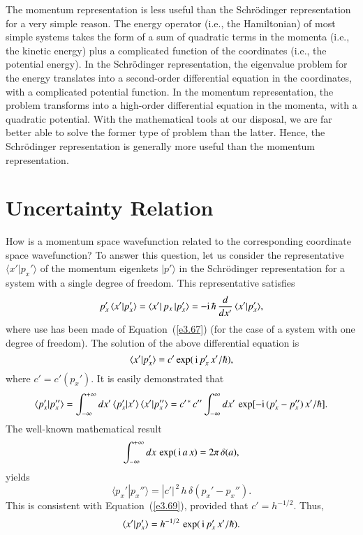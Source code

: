 The momentum representation is less useful than the Schr\"{o}dinger representation
for  a very simple reason. The energy operator ({\rm i.e.}, the Hamiltonian) of
most simple systems takes the form of a sum of quadratic terms in the momenta
({\rm i.e.}, the kinetic energy) plus a complicated function of the coordinates
({\rm i.e.}, the potential energy). In the Schr\"{o}dinger  representation,
the eigenvalue problem for the energy translates into a second-order differential
equation in the coordinates, with a complicated potential function. In the
momentum representation, the problem transforms into a high-order differential
equation in the momenta, with a quadratic potential. With the mathematical
tools at our disposal, we are far better able to solve the former type of problem
than the latter. Hence, the Schr\"{o}dinger  representation is
generally more useful than the momentum representation. 

\section{Uncertainty Relation}
How is a momentum space wavefunction related to the corresponding coordinate
space wavefunction? To answer this question, let us consider the
representative $\langle x'|p_x'\rangle$ of the
 momentum eigenkets $|p'\rangle$ in the Schr\"{o}dinger  representation
for a system with a single degree of freedom. This representative satisfies
\begin{equation}
p_x'\, \langle x'|p_x'\rangle = \langle x'|\,p_x\,|p_x'\rangle = -{\rm i}\,\hbar\,\frac{d}{dx'}\,
\langle x'|p_x'\rangle,
\end{equation}
where use has been made of Equation~(\ref{e3.67}) (for the case of a system with one
degree of freedom). The solution of the above  differential equation is
\begin{equation}
\langle x' | p_x'\rangle = c' \exp(\,{\rm i}\, p_x'\, x'/\hbar),
\end{equation}
where $c' = c'(p_x')$. It is easily demonstrated that
\begin{equation}
\langle p_x'|p_x''\rangle = \int_{-\infty}^{+\infty} dx'\,\langle p_x'|x'\rangle \,
\langle x'|p_x''\rangle = c'^{\,\ast}\, c'' \int_{-\infty}^{\infty}dx'\,\exp[-{\rm i}\,
(p_x'-p_x'')\,x'/\hbar].
\end{equation}
The well-known mathematical result
\begin{equation}\label{e3.83}
\int_{-\infty}^{+\infty}dx \,\exp(\,{\rm i}\, a\,x) = 2\pi\,\delta (a),
\end{equation}
yields
\begin{equation}
\langle p_x'|p_x''\rangle = |c'|^{\,2} \, h\, \delta(p_x'-p_x'').
\end{equation}
This is consistent with Equation~(\ref{e3.69}), provided that $c' = h^{-1/2}$. Thus,
\begin{equation}\label{e3.85}
\langle x'|p_x'\rangle = h^{-1/2}\, \exp(\,{\rm i}\, p_x'\, x'/\hbar).
\end{equation}

